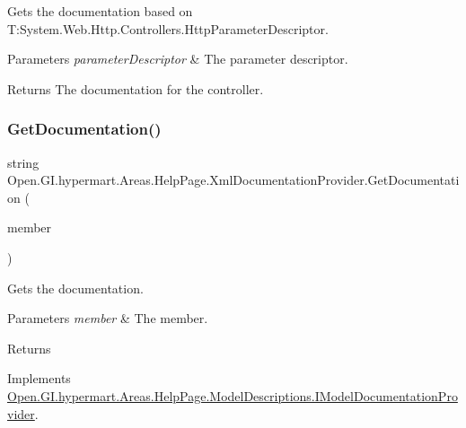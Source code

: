 Gets the documentation based on T\+:\+System.\+Web.\+Http.\+Controllers.\+Http\+Parameter\+Descriptor. 


\begin{DoxyParams}{Parameters}
{\em parameter\+Descriptor} & The parameter descriptor.\\
\hline
\end{DoxyParams}
\begin{DoxyReturn}{Returns}
The documentation for the controller. 
\end{DoxyReturn}
\hypertarget{class_open_1_1_g_i_1_1hypermart_1_1_areas_1_1_help_page_1_1_xml_documentation_provider_a1ba7e50dea71787a555f92306ec99efc}{}\label{class_open_1_1_g_i_1_1hypermart_1_1_areas_1_1_help_page_1_1_xml_documentation_provider_a1ba7e50dea71787a555f92306ec99efc} 
\subsubsection{\texorpdfstring{Get\+Documentation()}{GetDocumentation()}\hspace{0.1cm}{\footnotesize\ttfamily [4/5]}}
{\footnotesize\ttfamily string Open.\+G\+I.\+hypermart.\+Areas.\+Help\+Page.\+Xml\+Documentation\+Provider.\+Get\+Documentation (\begin{DoxyParamCaption}\item[{Member\+Info}]{member }\end{DoxyParamCaption})}



Gets the documentation. 


\begin{DoxyParams}{Parameters}
{\em member} & The member.\\
\hline
\end{DoxyParams}
\begin{DoxyReturn}{Returns}

\end{DoxyReturn}


Implements \hyperlink{interface_open_1_1_g_i_1_1hypermart_1_1_areas_1_1_help_page_1_1_model_descriptions_1_1_i_model_documentation_provider_a27d4470da05e52051ae345515c17755a}{Open.\+G\+I.\+hypermart.\+Areas.\+Help\+Page.\+Model\+Descriptions.\+I\+Model\+Documentation\+Provider}.

